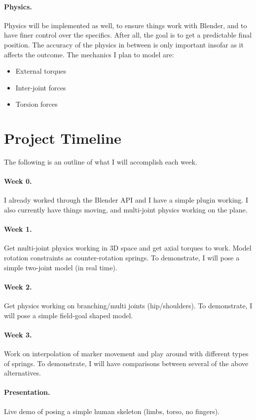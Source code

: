 \documentclass[10pt,twocolumn,letterpaper]{article}
\begin{document}
\paragraph{Physics.} Physics will be implemented as well, to ensure things work with Blender, and to have finer control over the specifics. After all, the goal is to get a predictable final position. The accuracy of the physics in between is only important insofar as it affects the outcome. The mechanics I plan to model are:
\begin{itemize}
    \item External torques
    \item Inter-joint forces
    \item Torsion forces
\end{itemize}

\section*{Project Timeline}

The following is an outline of what I will accomplish each week.

\paragraph{Week 0.} I already worked through the Blender API and I have a simple plugin working. I also currently have things moving, and multi-joint physics working on the plane.

\paragraph{Week 1.} Get multi-joint physics working in 3D space and get axial torques to work. Model rotation constraints as counter-rotation springs. To demonstrate, I will pose a simple two-joint model (in real time).

\paragraph{Week 2.} Get physics working on branching/multi joints (hip/shoulders). To demonstrate, I will pose a simple field-goal shaped model.

\paragraph{Week 3.} Work on interpolation of marker movement and play around with different types of springs. To demonstrate, I will have comparisons between several of the above alternatives.

\paragraph{Presentation.} Live demo of posing a simple human skeleton (limbs, torso, no fingers).



\end{document}
